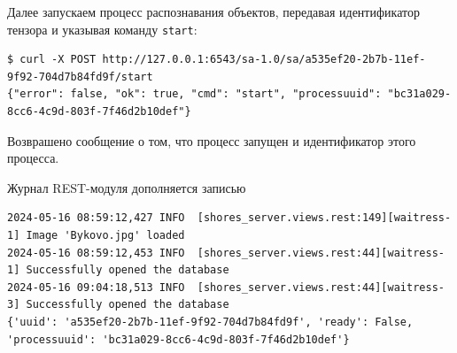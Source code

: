 \documentclass[732,fontsize=14pt,final]{studrep}
\begin{document}
Далее запускаем процесс распознавания объектов, передавая идентификатор тензора и указывая команду \verb|start|:
\begin{verbatim}
$ curl -X POST http://127.0.0.1:6543/sa-1.0/sa/a535ef20-2b7b-11ef-9f92-704d7b84fd9f/start
{"error": false, "ok": true, "cmd": "start", "processuuid": "bc31a029-8cc6-4c9d-803f-7f46d2b10def"}
\end{verbatim}
Возврашено сообщение о том, что процесс запущен и идентификатор этого процесса.

Журнал REST-модуля дополняется записью
\begin{verbatim}
2024-05-16 08:59:12,427 INFO  [shores_server.views.rest:149][waitress-1] Image 'Bykovo.jpg' loaded
2024-05-16 08:59:12,453 INFO  [shores_server.views.rest:44][waitress-1] Successfully opened the database
2024-05-16 09:04:18,513 INFO  [shores_server.views.rest:44][waitress-3] Successfully opened the database
{'uuid': 'a535ef20-2b7b-11ef-9f92-704d7b84fd9f', 'ready': False, 'processuuid': 'bc31a029-8cc6-4c9d-803f-7f46d2b10def'}
\end{verbatim}
  
\end{document}
